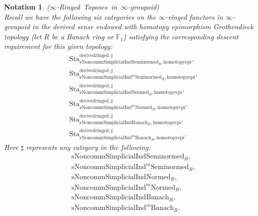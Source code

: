\documentclass[12pt]{book}
\newtheorem{notation}{Notation}
\begin{document}
\begin{notation}\mbox{\rm{($\infty$-Ringed Toposes in $\infty$-groupoid)}}\\
Recall we have the following six categories on the $\infty$-ringed functors in $\infty$-groupoid in the derived sense endowed with homotopy epimorphism Grothendieck topology (let $R$ be a Banach ring or $\mathbb{F}_1$) satisfying the corresponding descent requirement for this given topology:
\begin{align}
&\mathrm{Sta}^\mathrm{derivedringed,\sharp}_{\mathrm{sNoncomm}\mathrm{Simplicial}\mathrm{Ind}\mathrm{Seminormed}_R,\mathrm{homotopyepi}},\\
&\mathrm{Sta}^\mathrm{derivedringed,\sharp}_{\mathrm{sNoncomm}\mathrm{Simplicial}\mathrm{Ind}^m\mathrm{Seminormed}_R,\mathrm{homotopyepi}},\\
&\mathrm{Sta}^\mathrm{derivedringed,\sharp}_{\mathrm{sNoncomm}\mathrm{Simplicial}\mathrm{Ind}\mathrm{Normed}_R,\mathrm{homotopyepi}},\\
&\mathrm{Sta}^\mathrm{derivedringed,\sharp}_{\mathrm{sNoncomm}\mathrm{Simplicial}\mathrm{Ind}^m\mathrm{Normed}_R,\mathrm{homotopyepi}},\\
&\mathrm{Sta}^\mathrm{derivedringed,\sharp}_{\mathrm{sNoncomm}\mathrm{Simplicial}\mathrm{Ind}\mathrm{Banach}_R,\mathrm{homotopyepi}},\\
&\mathrm{Sta}^\mathrm{derivedringed,\sharp}_{\mathrm{sNoncomm}\mathrm{Simplicial}\mathrm{Ind}^m\mathrm{Banach}_R,\mathrm{homotopyepi}}.	
\end{align}
Here $\sharp$ represents any category in the following:
\begin{align}
&\mathrm{sNoncomm}\mathrm{Simplicial}\mathrm{Ind}\mathrm{Seminormed}_R,\\
&\mathrm{sNoncomm}\mathrm{Simplicial}\mathrm{Ind}^m\mathrm{Seminormed}_R,\\
&\mathrm{sNoncomm}\mathrm{Simplicial}\mathrm{Ind}\mathrm{Normed}_R,\\
&\mathrm{sNoncomm}\mathrm{Simplicial}\mathrm{Ind}^m\mathrm{Normed}_R,\\
&\mathrm{sNoncomm}\mathrm{Simplicial}\mathrm{Ind}\mathrm{Banach}_R,\\
&\mathrm{sNoncomm}\mathrm{Simplicial}\mathrm{Ind}^m\mathrm{Banach}_R.	
\end{align}	
\end{notation}
\end{document}
